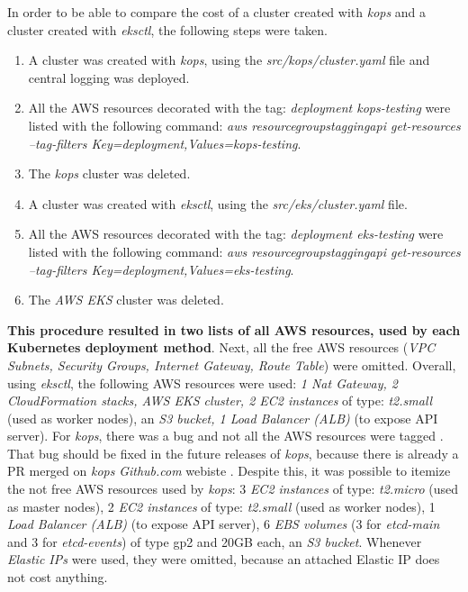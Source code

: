 In order to be able to compare the cost of a cluster created with \textit{kops} and a cluster created with \textit{eksctl}, the following steps were taken.
\begin{enumerate}
\item A cluster was created with \textit{kops}, using the \textit{src/kops/cluster.yaml} file and central logging was deployed.
\item All the AWS resources decorated with the tag: \textit{deployment kops-testing} were listed with the following command: \textit{aws resourcegroupstaggingapi get-resources --tag-filters Key=deployment,Values=kops-testing}.
\item The \textit{kops} cluster was deleted.
\item A cluster was created with \textit{eksctl}, using the \textit{src/eks/cluster.yaml} file.
\item All the AWS resources decorated with the tag: \textit{deployment eks-testing} were listed with the following command: \textit{aws resourcegroupstaggingapi get-resources --tag-filters Key=deployment,Values=eks-testing}.
\item The \textit{AWS EKS} cluster was deleted.
\end{enumerate}

\textbf{This procedure resulted in two lists of all AWS resources, used by each Kubernetes deployment method}. Next, all the free AWS resources (\textit{VPC Subnets, Security Groups, Internet Gateway, Route Table}) were omitted. Overall, using \textit{eksctl}, the following AWS resources were used: \textit{1 Nat Gateway, 2 CloudFormation stacks, AWS EKS cluster, 2 EC2 instances} of type: \textit{t2.small} (used as worker nodes), an \textit{S3 bucket, 1 Load Balancer (ALB)} (to expose API server). For \textit{kops}, there was a bug and not all the AWS resources were tagged \cite{kops-issue-tags}. That bug should be fixed in the future releases of \textit{kops}, because there is already a PR merged on \textit{kops} \textit{Github.com} webiste \cite{kops-issue-tags-pr}. Despite this, it was possible to itemize the not free AWS resources used by \textit{kops}: 3 \textit{EC2 instances} of type: \textit{t2.micro} (used as master nodes), 2 \textit{EC2 instances} of type: \textit{t2.small} (used as worker nodes), 1 \textit{Load Balancer (ALB)} (to expose API server), 6 \textit{EBS volumes} (3 for \textit{etcd-main} and 3 for \textit{etcd-events}) of type gp2 and 20GB each, an \textit{S3 bucket}. Whenever \textit{Elastic IPs} were used, they were omitted, because an attached Elastic IP does not cost anything.

